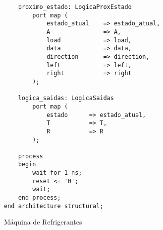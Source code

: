 \documentclass[a4paper,12pt]{article}
\newenvironment{code}{\captionsetup{type=listing}}{}
\begin{document}
\begin{code}
\begin{verbatim}
    proximo_estado: LogicaProxEstado
        port map (
            estado_atual    => estado_atual,
            A               => A,
            load            => load,
            data            => data,
            direction       => direction,
            left            => left,
            right           => right
        );

    logica_saidas: LogicaSaidas
        port map (
            estado      => estado_atual,
            T           => T,
            R           => R
        );

    process
    begin
        wait for 1 ns;
        reset <= '0';
        wait;
    end process;
end architecture structural;
    \end{verbatim}
    \caption{Máquina de Refrigerantes}
\end{code}
\end{document}
